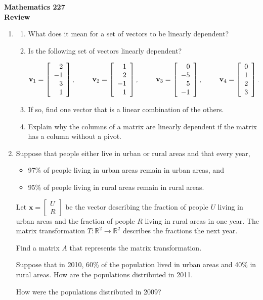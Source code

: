 \documentclass[12pt]{article}
\newcommand{\vs}[1]{\vspace{#1in}}
\newcommand{\vvec}{{\mathbf v}}
\newcommand{\xvec}{{\mathbf x}}
\newcommand{\real}{{\mathbb R}}
\newcommand{\twovec}[2]{\left[\begin{array}{r}#1 \\ #2
    \end{array}\right]}
\newcommand{\fourvec}[4]{\left[\begin{array}{r}#1 \\ #2 \\ #3 \\ #4
    \end{array}\right]}
\begin{document}
\noindent
{\bf Mathematics 227} \\ 
{\bf Review}

\bigskip
\begin{enumerate}
\item
  \begin{enumerate}[label=(\alph*)]
  \item What does it mean for a set of vectors to be linearly
    dependent?
    
    \vs{1}
  \item Is the following set of vectors linearly dependent?
    
    $$
    \vvec_1=\fourvec2{-1}31,\hspace*{24pt}
    \vvec_2=\fourvec12{-1}1,\hspace*{24pt}
    \vvec_3=\fourvec0{-5}5{-1},\hspace*{24pt}
    \vvec_4=\fourvec0123.
    $$
    
    \vs{1}
  \item If so, find one vector that is a linear combination of the
    others.
    
    \vs{1}
  \item Explain why the columns of a matrix are linearly dependent
    if the matrix has a column without a pivot.
    
    \vs{1}
  \end{enumerate}

\item Suppose that people either live in urban or rural areas and that
  every year, 
  \begin{itemize}
  \item 97\% of people living in urban areas remain in urban areas,
    and
  \item 95\% of people living in rural areas remain in rural areas.
  \end{itemize}

  Let $\xvec=\twovec UR$ be the vector describing the fraction of
  people $U$ living in urban areas and the fraction of people $R$
  living in rural areas in one year.  The matrix transformation
  $T:\real^2\to\real^2$ describes the fractions the next year.

  \medskip
  Find a matrix $A$ that represents the matrix transformation.

  \vs{1}
  Suppose that in 2010, 60\% of the population lived in urban areas
  and 40\% in rural areas.  How are the populations distributed in
  2011.

  \vs{1}
  How were the populations distributed in 2009?


\end{enumerate}
\end{document}
